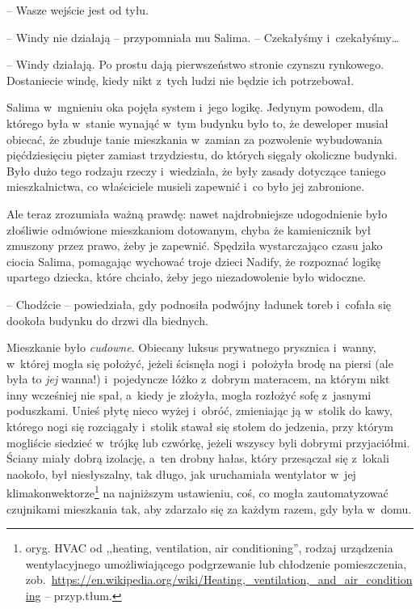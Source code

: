 \documentclass[oneside,polish,11pt,sfheadings]{mwbk}
\begin{document}
-- Wasze wejście jest od
tyłu.

-- Windy nie działają -- przypomniała mu Salima. -- Czekałyśmy i~czekałyśmy\ldots 

-- Windy działają. Po prostu dają pierwszeństwo stronie czynszu
rynkowego. Dostaniecie windę, kiedy nikt z~tych ludzi nie będzie ich
potrzebował.

Salima w~mgnieniu oka pojęła system i~jego logikę. Jedynym powodem, dla
którego była w~stanie wynająć w~tym budynku było to, że deweloper musiał
obiecać, że zbuduje tanie mieszkania w~zamian za pozwolenie wybudowania
pięćdziesięciu pięter zamiast trzydziestu, do których sięgały okoliczne
budynki. Było dużo tego rodzaju rzeczy i~wiedziała, że były zasady
dotyczące taniego mieszkalnictwa, co właściciele musieli zapewnić i~co
było jej zabronione.

Ale teraz zrozumiała ważną prawdę: nawet najdrobniejsze udogodnienie
było złośliwie odmówione mieszkaniom dotowanym, chyba że kamienicznik
był zmuszony przez prawo, żeby je zapewnić. Spędziła wystarczająco czasu
jako ciocia Salima, pomagając wychować troje dzieci Nadify, że rozpoznać
logikę upartego dziecka, które chciało, żeby jego niezadowolenie było
widoczne.

-- Chodźcie -- powiedziała, gdy podnosiła podwójny ładunek toreb i~cofała
się dookoła budynku do drzwi dla biednych.

Mieszkanie było \textit{cudowne}. Obiecany luksus prywatnego prysznica i~wanny, w~której mogła się położyć, jeżeli ścisnęła nogi i~położyła brodę
na piersi (ale była to \textit{jej} wanna!) i~pojedyncze łóżko z~dobrym
materacem, na którym nikt inny wcześniej nie spał, a~kiedy je złożyła,
mogła rozłożyć sofę z~jasnymi poduszkami. Unieś płytę nieco wyżej i~obróć, zmieniając ją w~stolik do kawy, którego nogi się rozciągały i~stolik stawał się stołem do jedzenia, przy którym mogliście siedzieć w~trójkę lub czwórkę, jeżeli wszyscy byli dobrymi przyjaciółmi. Ściany
miały dobrą izolację, a~ten drobny hałas, który przesączał się z~lokali
naokoło, był niesłyszalny, tak długo, jak uruchamiała wentylator w~jej
klimakonwektorze\footnote{ oryg. HVAC od ,,heating, ventilation, air
conditioning'', rodzaj urządzenia wentylacyjnego umożliwiającego
podgrzewanie lub chłodzenie pomieszczenia,
zob.~\url{https://en.wikipedia.org/wiki/Heating,\_ventilation,\_and\_air\_conditioning}
-- przyp.tłum.} na najniższym ustawieniu, coś, co mogła zautomatyzować
czujnikami mieszkania tak, aby zdarzało się za każdym razem, gdy była w~domu.
\end{document}
